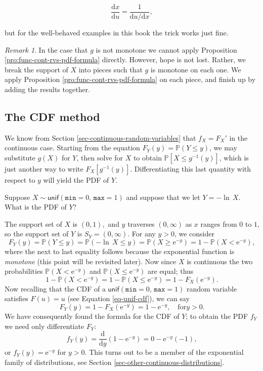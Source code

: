 \documentclass[]{book}
\numberwithin{equation}{chapter}
\numberwithin{figure}{chapter}
\theoremstyle{plain}
\theoremstyle{definition}
\theoremstyle{remark}
\theoremstyle{definition}
\theoremstyle{definition}
\theoremstyle{remark}
\newtheorem*{remark}{Remark}
\let\BeginKnitrBlock\begin \let\EndKnitrBlock\end
\begin{document}
\begin{equation}
\label{eq-univ-jacob-recip}
\frac{\mathrm{d} x}{\mathrm{d} u}=\frac{1}{\mathrm{d} u/\mathrm{d} x},
\end{equation}

but for the well-behaved examples in this book the trick works just
fine.

\bigskip

\begin{remark}
In the case that \(g\) is not monotone we cannot apply Proposition
\ref{pro:func-cont-rvs-pdf-formula} directly. However, hope is not lost.
Rather, we break the support of \(X\) into pieces such that \(g\) is
monotone on each one. We apply Proposition
\ref{pro:func-cont-rvs-pdf-formula} on each piece, and finish up by
adding the results together.
\end{remark}

\subsection{The CDF method}\label{the-cdf-method}

We know from Section \ref{sec-continuous-random-variables} that
\(f_{X}=F_{X}'\) in the continuous case. Starting from the equation
\(F_{Y}(y)=\mathbb{P}(Y\leq y)\), we may substitute \(g(X)\) for \(Y\),
then solve for \(X\) to obtain \(\mathbb{P}[X\leq g^{-1}(y)]\), which is
just another way to write \(F_{X}[g^{-1}(y)]\). Differentiating this
last quantity with respect to \(y\) will yield the PDF of \(Y\).

\bigskip

\BeginKnitrBlock{example}
\protect\hypertarget{ex:unnamed-chunk-278}{}{\label{ex:unnamed-chunk-278}}Suppose
\(X\sim\mathsf{unif}(\mathtt{min}=0,\,\mathtt{max}=1)\) and suppose that
we let \(Y=-\ln\, X\). What is the PDF of \(Y\)?
\EndKnitrBlock{example}

The support set of \(X\) is \((0,1),\) and \(y\) traverses
\((0,\infty)\) as \(x\) ranges from \(0\) to \(1\), so the support set
of \(Y\) is \(S_{Y}=(0,\infty)\). For any \(y>0\), we consider \[
F_{Y}(y)=\mathbb{P}(Y\leq y)=\mathbb{P}(-\ln\, X\leq
y)=\mathbb{P}(X\geq\mathrm{e}^{-y})=1-\mathbb{P}(X<\mathrm{e}^{-y}),
\] where the next to last equality follows because the exponential
function is \emph{monotone} (this point will be revisited later). Now
since \(X\) is continuous the two probabilities
\(\mathbb{P}(X<\mathrm{e}^{-y})\) and
\(\mathbb{P}(X\leq\mathrm{e}^{-y})\) are equal; thus \[ 1-\mathbb{P}(X
<
\mathrm{e}^{-y})=1-\mathbb{P}(X\leq\mathrm{e}^{-y})=1-F_{X}(\mathrm{e}^{-y}).
\] Now recalling that the CDF of a
\(\mathsf{unif}(\mathtt{min}=0,\,\mathtt{max}=1)\) random variable
satisfies \(F(u)=u\) (see Equation \eqref{eq-unif-cdf}), we can say \[
F_{Y}(y)=1-F_{X}(\mathrm{e}^{-y})=1-\mathrm{e}^{-y},\quad \mbox{for
}y>0.  \] We have consequently found the formula for the CDF of \(Y\);
to obtain the PDF \(f_{Y}\) we need only differentiate \(F_{Y}\): \[
f_{Y}(y)=\frac{\mathrm{d}}{\mathrm{d}
y}\left(1-\mathrm{e}^{-y}\right)=0-\mathrm{e}^{-y}(-1), \] or
\(f_{Y}(y)=\mathrm{e}^{-y}\) for \(y>0\). This turns out to be a member
of the exponential family of distributions, see Section
\ref{sec-other-continuous-distributions}.
\end{document}

